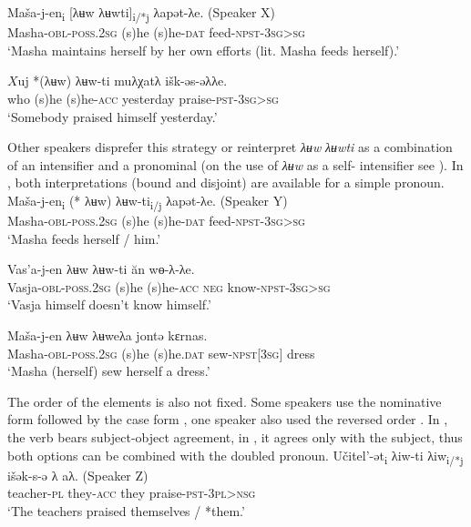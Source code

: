 \documentclass[output=paper]{langscibook}
\begin{document}
\ea 
\label{ex:Volkova:40}
	\ea
	\label{ex:Volkova:40a}
  	 \gll Maša-j-en\textsubscript{i}  [λʉw λʉwti]\textsubscript{i/*j} λapət-λe. \textup{(Speaker X)}\\
  	 Masha\textsc{{}-obl-poss.2sg} (s)he (s)he\textsc{{}-dat} feed\textsc{{}-npst-3sg>sg}\\
  	 \glt ‘Masha maintains herself by her own efforts (lit. Masha feeds herself).’

	\ex
	\label{ex:Volkova:40b}
  	 \gll $X$uj *(λʉw) λʉw-ti muλχatλ išk-əs-əλλe.\\
  	 who (s)he (s)he\textsc{{}-acc} yesterday praise\textsc{{}-pst-3sg>sg}\\
  	 \glt ‘Somebody praised himself yesterday.’
	\z
\z
 
Other speakers disprefer this strategy  or reinterpret \textit{λʉw} \textit{λʉwti} as a combination of an intensifier and a pronominal (on the use of \textit{λʉw} as a self-%
intensifier see ). In , both interpretations (bound and disjoint) are available for a simple pronoun. 
\ea 
\label{ex:Volkova:41}
	\ea
	\label{ex:Volkova:41a}
  	 \gll Maša-j-en\textsubscript{i}  (* λʉw) λʉw-ti\textsubscript{i/j} λapət-λe. \textup{(Speaker Y)}\\
  	Masha\textsc{{}-obl-poss.2sg} (s)he (s)he\textsc{{}-dat} feed\textsc{{}-npst-3sg>sg} \\
  	 \glt ‘Masha feeds herself / him.’

	\ex
	\label{ex:Volkova:41b}
  	 \gll Vas’a-j-en  λʉw λʉw-ti ăn wɵ-λ-λe.\\
  	 Vasja\textsc{{}-obl-poss.2sg} (s)he (s)he\textsc{{}-acc neg} know\textsc{{}-npst-3sg>sg}\\
  	 \glt ‘Vasja himself doesn’t know himself.’
	
	\ex
	\label{ex:Volkova:41c}
  	 \gll Maša-j-en  λʉw λʉweλa jontə kɛrnas.\\
  	 Masha\textsc{{}-obl-poss.2sg} (s)he (s)he\textsc{.dat} sew\textsc{{}-npst[3sg]} dress\\
  	 \glt ‘Masha (herself) sew herself a dress.’
	\z
\z



The order of the elements is also not fixed. Some speakers use the nominative form followed by the case form , one speaker also used the reversed order . In , the verb bears subject-object agreement, in , it agrees only with the subject, thus both options can be combined with the doubled pronoun.
\ea 
\label{ex:Volkova:42}
	\ea
	\label{ex:Volkova:42a}
  	 \gll Učitel’-ət\textsubscript{i} λiw-ti λiw\textsubscript{i/*j} išək-s-ə λ aλ. \textup{(Speaker Z)}\\
  	 teacher-\textsc{pl} they-\textsc{acc} they praise-\textsc{pst-3pl>nsg}\\
  	 \glt ‘The teachers praised themselves / *them.’
\end{document}
